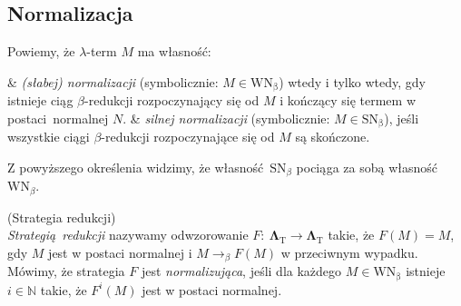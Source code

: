 \subsection{Normalizacja}
\noindent Powiemy, że \(\lambda\)-term \(M\) ma własność:
\begin{easylist}
  & \emph{(słabej) normalizacji} (symbolicznie: \(M\in\mathrm{WN_{\beta}}\)) wtedy i tylko wtedy, gdy istnieje ciąg \(\beta\)-redukcji rozpoczynający się od \(M\) i kończący się termem w postaci normalnej \(N\). 
  &  \emph{silnej normalizacji} (symbolicznie: \(M\in\mathrm{SN_{\beta}}\)), jeśli wszystkie ciągi \(\beta\)-redukcji rozpoczynające się od \(M\) są skończone.
\end{easylist}
\noindent Z powyższego określenia  widzimy, że własność \(\mathrm{SN}_{\beta}\) pociąga za sobą własność \(\mathrm{WN}_{\beta}\).

\begin{definicja}(Strategia redukcji)\\
  \emph{Strategią redukcji} nazywamy odwzorowanie \(F:\:\mathbf{\Lambda}_{\mathrm{T}}\longrightarrow\mathbf{\Lambda}_{\mathrm{T}}\) takie, że \(F(M)=M\), gdy \(M\) jest w postaci normalnej i \(M\longrightarrow_{\beta}F(M)\) w przeciwnym wypadku. Mówimy, że strategia \(F\) jest \emph{normalizująca}, jeśli dla każdego \(M\in \mathrm{WN_\beta}\) istnieje \(i\in\mathbb{N}\) takie, że \(F^i (M)\) jest w postaci normalnej.
\end{definicja}

